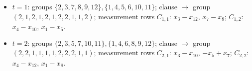 \begin{itemize}[leftmargin=1.4em,itemsep=1pt,topsep=2pt]
\item $t = 1$: groups $\{2,3,7,8,9,12\}, \{1,4,5,6,10,11\}$; clause $\to$ group $(2,1,2,1,2,1,2,2,1,1,2)$; measurement rows $C_{1,1}$: $x_{3} - x_{12}$, $x_{7} - x_{8}$; $C_{1,2}$: $x_{4} - x_{10}$, $x_{1} - x_{5}$.
\item $t = 2$: groups $\{2,3,5,7,10,11\}, \{1,4,6,8,9,12\}$; clause $\to$ group $(2,2,1,1,1,1,2,2,2,1,1)$; measurement rows $C_{2,1}$: $x_{3} - x_{10}$, $-x_{5} + x_{7}$; $C_{2,2}$: $x_{4} - x_{12}$, $x_{1} - x_{8}$.
\end{itemize}
